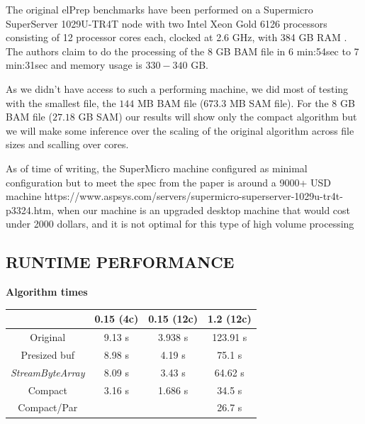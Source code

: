 \documentclass[a4paper,twoside]{article}
\begin{document}
The original elPrep benchmarks have been performed on a Supermicro SuperServer 1029U-TR4T node with two
Intel Xeon Gold 6126 processors consisting of 12 processor cores each, clocked at 2.6 GHz, with 384 GB
RAM \cite{costanza:2019}. The authors claim to do the processing of the 8 GB BAM file in 6 min:54sec to 7 min:31sec and memory usage is $330-340$ GB.

As we didn't have access to such a performing machine, we did most of testing with the smallest file, the $144$ MB BAM file ($673.3$ MB SAM file). For the $8$ GB BAM file ($27.18$ GB SAM) our results will show only the compact algorithm but we will make some inference over the scaling of the original algorithm across file sizes and scalling over cores.

As of time of writing, the SuperMicro machine configured as minimal configuration but to meet the spec from the paper is around a 9000+ USD machine https://www.aspsys.com/servers/supermicro-superserver-1029u-tr4t-p3324.htm, when our machine is an upgraded desktop machine that would cost under 2000 dollars, and it is not optimal for this type of high volume processing

\subsection{\uppercase{Runtime performance}}
\begin{small}
\par
\textbf{Algorithm times} \\
\vspace{-0.4cm}
\begin{center}
\begin{tabular}{|c|c|c|c|}
\hline
						& 0.15 (4c)		    & 0.15 (12c)		& 1.2 (12c) 			\\ \hline
Original				& 9.13 s			& 3.938 s			& 123.91 s			\\ \hline
Presized buf   			& 8.98 s			& 4.19 s			& 75.1 s	\\ \hline
{\it StreamByteArray}	& 8.09 s			& 3.43 s			& 64.62 s			\\ \hline
Compact 				& 3.16 s			& 1.686 s			& 34.5 s	\\ \hline
Compact/Par 			& 			        & 					& 26.7 s	\\ \hline
\end{tabular}
\end{center}
\end{small}
\end{document}
